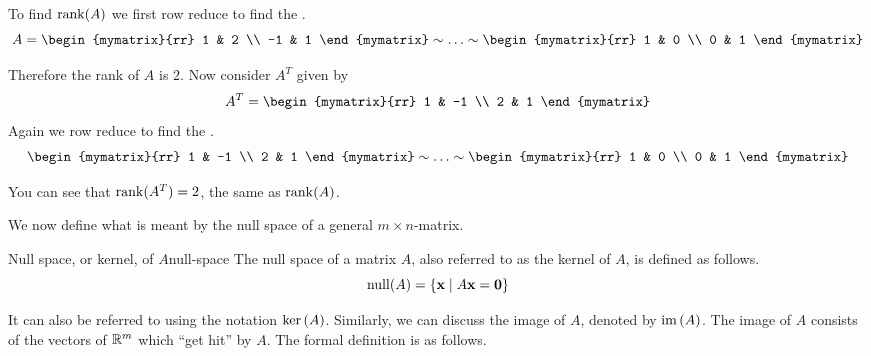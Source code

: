 \begin{solution}
  To find $\rank(A)$ we first row reduce to find the {\rref}.
  \begin{equation*}
    A =
    \begin{mymatrix}{rr}
      1 & 2 \\
      -1 & 1
    \end{mymatrix}
    \sim\ldots\sim
    \begin{mymatrix}{rr}
      1 & 0 \\
      0 & 1
    \end{mymatrix}
  \end{equation*}

  Therefore the rank of $A$ is $2$. Now consider $A^T$ given by
  \begin{equation*}
    A^T = \begin{mymatrix}{rr}
      1 & -1 \\
      2 & 1
    \end{mymatrix}
  \end{equation*}
  Again we row reduce to find the {\rref}.
  \begin{equation*}
    \begin{mymatrix}{rr}
      1 & -1 \\
      2 & 1
    \end{mymatrix}
    \sim\ldots\sim
    \begin{mymatrix}{rr}
      1 & 0 \\
      0 & 1
    \end{mymatrix}
  \end{equation*}

  You can see that $\rank(A^T) = 2$, the same as $\rank(A)$.
\end{solution}

We now define what is meant by the null space of a general
$m\times n$-matrix.

\begin{definition}{Null space, or kernel, of $A$}{null-space}
  The null space of a matrix $A$, also referred to as the kernel of
  $A$, is defined as follows.%
  \begin{equation*}
    \nullspace(A) =\set{\vect{x} \mid A \vect{x} =\vect{0}}
  \end{equation*}
\end{definition}

It can also be referred to using the notation $\ker \left( A\right)$.
Similarly, we can discuss the image of $A$, denoted by
$\mbox{\rm im}\left(A\right)$. The image of $A$ consists of the vectors of
$\mathbb{R}^{m}$ which ``get hit'' by $A$.  The formal definition is as
follows.

